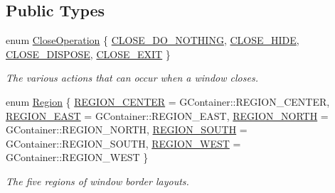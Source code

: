 \subsection*{Public Types}
\begin{DoxyCompactItemize}
\item 
enum \mbox{\hyperlink{classsgl_1_1GWindow_a84803201f0f9569db61f51cac9e0d2d2}{Close\+Operation}} \{ \mbox{\hyperlink{classsgl_1_1GWindow_a84803201f0f9569db61f51cac9e0d2d2aa00045aa0b706ef54f34c37f2d49f2b5}{C\+L\+O\+S\+E\+\_\+\+D\+O\+\_\+\+N\+O\+T\+H\+I\+NG}}, 
\mbox{\hyperlink{classsgl_1_1GWindow_a84803201f0f9569db61f51cac9e0d2d2a47d285d1f0c66414bb23b7f3f3c6554b}{C\+L\+O\+S\+E\+\_\+\+H\+I\+DE}}, 
\mbox{\hyperlink{classsgl_1_1GWindow_a84803201f0f9569db61f51cac9e0d2d2a1b8c84e0e965a877f9253f15747304f1}{C\+L\+O\+S\+E\+\_\+\+D\+I\+S\+P\+O\+SE}}, 
\mbox{\hyperlink{classsgl_1_1GWindow_a84803201f0f9569db61f51cac9e0d2d2a74cdc7c2dc555e3334f91d8ce3e00f79}{C\+L\+O\+S\+E\+\_\+\+E\+X\+IT}}
 \}
\begin{DoxyCompactList}\small\item\em The various actions that can occur when a window closes. \end{DoxyCompactList}\item 
enum \mbox{\hyperlink{classsgl_1_1GWindow_a81a01a86de31071a92e6cce0bab9bc4b}{Region}} \{ \mbox{\hyperlink{classsgl_1_1GWindow_a81a01a86de31071a92e6cce0bab9bc4ba5ba85a564dbf472d69f92d5a2870db16}{R\+E\+G\+I\+O\+N\+\_\+\+C\+E\+N\+T\+ER}} = G\+Container\+:\+:R\+E\+G\+I\+O\+N\+\_\+\+C\+E\+N\+T\+ER, 
\mbox{\hyperlink{classsgl_1_1GWindow_a81a01a86de31071a92e6cce0bab9bc4baac78951bd4e01d20f4825d5ae0a54357}{R\+E\+G\+I\+O\+N\+\_\+\+E\+A\+ST}} = G\+Container\+:\+:R\+E\+G\+I\+O\+N\+\_\+\+E\+A\+ST, 
\mbox{\hyperlink{classsgl_1_1GWindow_a81a01a86de31071a92e6cce0bab9bc4baf40d135fb811ad59acb102f1fb357550}{R\+E\+G\+I\+O\+N\+\_\+\+N\+O\+R\+TH}} = G\+Container\+:\+:R\+E\+G\+I\+O\+N\+\_\+\+N\+O\+R\+TH, 
\mbox{\hyperlink{classsgl_1_1GWindow_a81a01a86de31071a92e6cce0bab9bc4bab533512ba438173a4ceb9c501eb17628}{R\+E\+G\+I\+O\+N\+\_\+\+S\+O\+U\+TH}} = G\+Container\+:\+:R\+E\+G\+I\+O\+N\+\_\+\+S\+O\+U\+TH, 
\mbox{\hyperlink{classsgl_1_1GWindow_a81a01a86de31071a92e6cce0bab9bc4ba5dd8c2219af001263c00de02b642786d}{R\+E\+G\+I\+O\+N\+\_\+\+W\+E\+ST}} = G\+Container\+:\+:R\+E\+G\+I\+O\+N\+\_\+\+W\+E\+ST
 \}
\begin{DoxyCompactList}\small\item\em The five regions of window border layouts. \end{DoxyCompactList}\end{DoxyCompactItemize}

